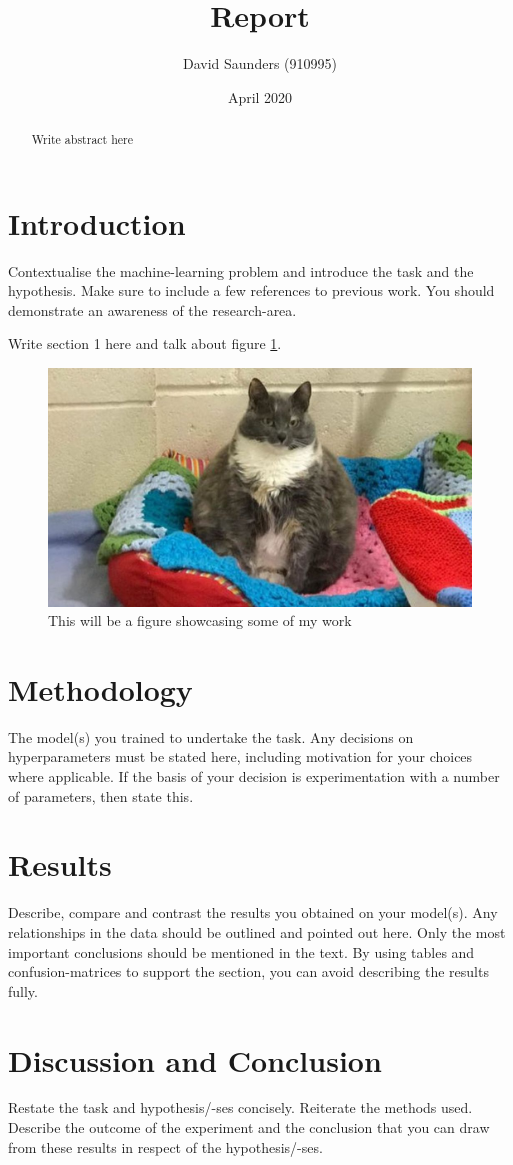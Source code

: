 \documentclass{article}
\title{Report}
\author{David Saunders (910995)}
\date{April 2020}
\begin{document}
\maketitle

\begin{abstract} 
    Write abstract here
\end{abstract}

\tableofcontents

\section{Introduction}

Contextualise the machine-learning problem and introduce the
task and the hypothesis. Make sure to include a few references to previous
work. You should demonstrate an awareness of the research-area.

Write section 1 here \cite{torsney2011tuner} and talk about figure \ref{fig:test}.

\begin{figure}[ht]
    \centering
    \includegraphics[scale=0.35]{Test.JPG}
    \caption{This will be a figure showcasing some of my work}
    \label{fig:test}
\end{figure}

\section{Methodology}
The model(s) you trained to undertake the task. Any decisions
on hyperparameters must be stated here, including motivation for your
choices where applicable. If the basis of your decision is experimentation
with a number of parameters, then state this.

\section{Results}
Describe, compare and contrast the results you obtained on your
model(s). Any relationships in the data should be outlined and pointed
out here. Only the most important conclusions should be mentioned in
the text. By using tables and confusion-matrices to support the section,
you can avoid describing the results fully.

\section{Discussion and Conclusion}
Restate the task and hypothesis/-ses concisely.
Reiterate the methods used. Describe the outcome of the experiment
and the conclusion that you can draw from these results in respect of the
hypothesis/-ses.

\printbibliography
\end{document}
